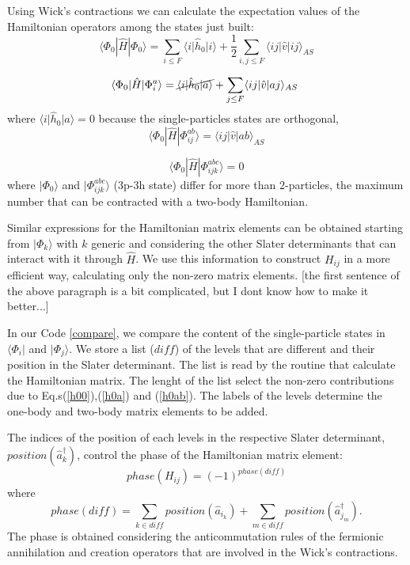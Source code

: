 \documentclass[twoside]{article}
\newcommand{\bra}[1]{\langle #1 |}
\newcommand{\ket}[1]{| #1 \rangle}
\begin{document}
Using Wick's contractions we can calculate the expectation values of the Hamiltonian operators among the states just built:
\begin{equation}\label{h00}
\bra{\Phi_0} \hat H \ket{\Phi_0} = \sum_{i \leq F} \langle i \vert \hat h_0 \vert i \rangle + \frac{1}{2} \sum_{i,j \leq F} \langle i j\vert \hat v \vert ij \rangle_{AS} 
\end{equation}

\begin{equation}\label{h0a}
\bra{\Phi_0} \hat H \ket{\Phi_i^a} =  \cancel{\langle i \vert \hat h_0 \vert a \rangle} +  \sum_{j \leq F} \langle i j\vert \hat v \vert aj \rangle_{AS} \; 
\end{equation}
where ${\langle i \vert \hat h_0 \vert a \rangle}=0$ because the single-particles states are orthogonal,
\begin{equation}\label{h0ab}
\bra{\Phi_0} \hat H \ket{\Phi_{ij}^{ab}} =  \langle i j\vert \hat v \vert ab \rangle_{AS}
\end{equation}

\begin{equation}
\bra{\Phi_0} \hat H \ket{\Phi_{ijk}^{abc}} = 0
\end{equation}
where $\ket{\Phi_0}$ and $\ket{\Phi_{ijk}^{abc}}$ (3p-3h state) differ for more than 2-particles, the maximum number that can be contracted with a two-body Hamiltonian.

Similar expressions for the Hamiltonian matrix elements can be obtained starting from $\ket{\Phi_k}$ with $k$ generic and considering the other Slater determinants that can interact with it through $\hat H$. We use this information to construct $H_{ij}$ in a more efficient way, calculating only the non-zero matrix elements.
[the first sentence of the above paragraph is a bit complicated, but I dont know how to make it better...]

In our Code \ref{compare}, we compare the content of the single-particle states in $\bra{\Phi_i}$ and $\ket{\Phi_j}$. We store a list ($diff$) of the levels that are different and their position in the Slater determinant. The list is read by the routine that calculate the Hamiltonian matrix. The lenght of the list select the non-zero contributions due to Eq.s(\ref{h00}),(\ref{h0a}) and (\ref{h0ab}). The labels of the levels determine the one-body and two-body matrix elements to be added. 

The indices of the position of each levels in the respective Slater determinant, $position(\hat a_{k}^\dagger)$, control the phase of the Hamiltonian matrix element:
\begin{equation}
phase(H_{ij}) = (-1)^{phase(diff)} 
\end{equation}
where
\begin{equation}
phase(diff)=\sum_{k \in diff} position(\hat a_{i_k})+\sum_{m \in diff} position(\hat a_{j_m}^\dagger).
\end{equation}
The phase is obtained considering the anticommutation rules of the fermionic annihilation and creation operators that are involved in the Wick's contractions.
\end{document}
